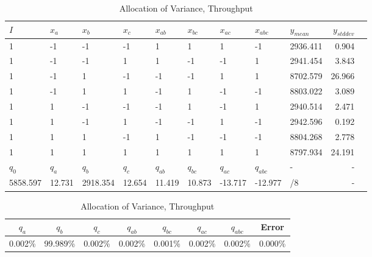 \documentclass[11pt,a4paper]{article}
\begin{document}
\begin{table}
    \begin{subtable}{1.0\linewidth}\centering
        {\begin{tabular}{lllllllllrr}
            \hline
            $I$ & $x_a$ & $x_b$ & $x_c$ & $x_{ab}$ & $x_{bc}$ & $x_{ac}$ & $x_{abc}$ & $y_{mean}$ & $y_{stddev}$\\
            \hline
                    1 &     -1 &       -1 &     -1 &      1 &      1 &       1 &      -1 & 2936.411 &   0.904 \\
                    1 &     -1 &       -1 &      1 &      1 &     -1 &      -1 &       1 & 2941.454 &   3.843 \\
                    1 &     -1 &        1 &     -1 &     -1 &     -1 &       1 &       1 & 8702.579 &  26.966 \\
                    1 &     -1 &        1 &      1 &     -1 &      1 &      -1 &      -1 & 8803.022 &   3.089 \\
                    1 &      1 &       -1 &     -1 &     -1 &      1 &      -1 &       1 & 2940.514 &   2.471 \\
                    1 &      1 &       -1 &      1 &     -1 &     -1 &       1 &      -1 & 2942.596 &   0.192 \\
                    1 &      1 &        1 &     -1 &      1 &     -1 &      -1 &      -1 & 8804.268 &   2.778 \\
                    1 &      1 &        1 &      1 &      1 &      1 &       1 &       1 & 8797.934 &  24.191 \\
            \hline
            $q_0$ & $q_a$ & $q_b$ & $q_c$ & $q_{ab}$ & $q_{bc}$ & $q_{ac}$ & $q_{abc}$ & - & -\\
              5858.597 & 12.731 & 2918.354 & 12.654 & 11.419 & 10.873 & -13.717 & -12.977 & /8 & - \\
            \hline
        \end{tabular}
        \caption{Parameters and Effect Sizes, Throughput}}
    \end{subtable}
    \begin{subtable}{1.0\linewidth}\centering
        {\begin{tabular}{|cccccccc|}
            \hline
            $q_a$ & $q_b$ & $q_c$ & $q_{ab}$ & $q_{bc}$ & $q_{ac}$ & $q_{abc}$ & Error \\
            \hline
            0.002\% & 99.989\% & 0.002\% & 0.002\%   &  0.001\%   &   0.002\%  &   0.002\%   & 0.000\% \\
            \hline
        \end{tabular}
        \caption{Allocation of Variance, Throughput}}
    \end{subtable}


\end{table}
\end{document}
